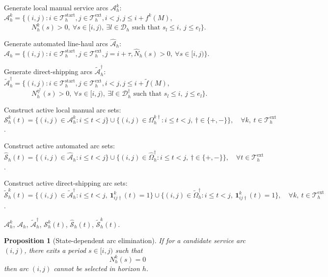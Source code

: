\documentclass[10pt, reqno]{amsart}
\newtheorem{proposition}[theorem]{Proposition}
\begin{document}
\begin{algorithm}[!t]
\begin{algorithmic}[1]
\State Generate local manual service arcs $\mathcal{A}_h^k$:
\Statex \quad
$\mathcal{A}_h^k
=
\big\{
(i,j):
i\in\mathcal{T}_h^{\mathrm{start}},
j\in\mathcal{T}_h^{\mathrm{ext}},
i<j,
j\le i+f^k(M),$
\Statex
$\qquad\qquad
N_h^k(s)>0,\ \forall s\in[i,j),
\ \exists l\in\mathcal D_h
\text{ such that } s_l\le i,\ j\le e_l
\big\}$.

\State Generate automated line-haul arcs $\widehat{\mathcal{A}}_h$:
\Statex \quad
$\widehat{\mathcal{A}}_h
=
\big\{
(i,j):
i\in\mathcal{T}_h^{\mathrm{start}},
j\in\mathcal{T}_h^{\mathrm{ext}},
j=i+\tau,
\widehat N_h(s)>0,\ \forall s\in[i,j)
\big\}$.

\State Generate direct-shipping arcs $\widetilde{\mathcal{A}}_h^\dagger$:
\Statex \quad
$\widetilde{\mathcal{A}}_h^\dagger
=
\big\{
(i,j):
i\in\mathcal{T}_h^{\mathrm{start}},
j\in\mathcal{T}_h^{\mathrm{ext}},
i<j,
j\le i+\widetilde f(M),$
\Statex
$\qquad\qquad
N_h^{\eta^\dagger}(s)>0,\ \forall s\in[i,j),
\ \exists l\in\mathcal D_h^\dagger
\text{ such that } s_l\le i,\ j\le e_l
\big\}$.

\State Construct active local manual arc sets:
\Statex \quad
$\mathcal{S}_h^k(t)
=
\{(i,j)\in\mathcal{A}_h^k:i\le t<j\}
\cup
\{(i,j)\in\Omega_h^{k\dagger}:i\le t<j,\ \dagger\in\{+,-\}\},
\quad
\forall k,\ t\in\mathcal{T}_h^{\mathrm{ext}}$.

\State Construct active automated arc sets:
\Statex \quad
$\widehat{\mathcal{S}}_h(t)
=
\{(i,j)\in\widehat{\mathcal{A}}_h:i\le t<j\}
\cup
\{(i,j)\in\widehat{\Omega}_h^\dagger:i\le t<j,\ \dagger\in\{+,-\}\},
\quad
\forall t\in\mathcal{T}_h^{\mathrm{ext}}$.

\State Construct active direct-shipping arc sets:
\Statex \quad
$\widetilde{\mathcal{S}}_h^k(t)
=
\{(i,j)\in\widetilde{\mathcal{A}}_h^\dagger:
i\le t<j,\ \mathbf{1}_{ij\dagger}^k(t)=1\}
\cup
\{(i,j)\in\widetilde{\Omega}_h^\dagger:
i\le t<j,\ \mathbf{1}_{ij\dagger}^k(t)=1\},
\quad
\forall k,\ t\in\mathcal{T}_h^{\mathrm{ext}}$.

\State \Return
$\mathcal{A}_h^k$,
$\widehat{\mathcal{A}}_h$,
$\widetilde{\mathcal{A}}_h^\dagger$,
$\mathcal{S}_h^k(t)$,
$\widehat{\mathcal{S}}_h(t)$,
$\widetilde{\mathcal{S}}_h^k(t)$.

\end{algorithmic}
\end{algorithm}
\begin{proposition}[State-dependent arc elimination]\label{prop:rha can gen}
    If for a candidate service arc $(i,j)$, there exits a period $s\in[i,j)$ such that
    \[
    N^k_h(s)=0
    \]
    then arc $(i,j)$ cannot be selected in horizon $h$.
\end{proposition}
\end{document}

